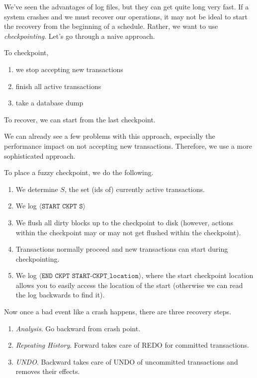     We've seen the advantages of log files, but they can get quite long very fast. If a system crashes and we must recover our operations, it may not be ideal to start the recovery from the beginning of a schedule. Rather, we want to use \textit{checkpointing}. Let's go through a naive approach. 

    \begin{definition}
      \label{def:naive-checkpointing}
       To checkpoint, 
       \begin{enumerate}
         \item we stop accepting new transactions 
         \item finish all active transactions 
         \item take a database dump
       \end{enumerate}
       To recover, we can start from the last checkpoint. 
    \end{definition} 

    We can already see a few problems with this approach, especially the performance impact on not accepting new transactions. Therefore, we use a more sophisticated approach. 

    \begin{definition}
      \label{def:fuzzy-checkpointing}
      To place a fuzzy checkpoint, we do the following. 
      \begin{enumerate}
        \item We determine $S$, the set (ids of) currently active transactions. 
        \item We log $\langle \texttt{START CKPT S} \rangle$ 
        \item We flush all dirty blocks up to the checkpoint to disk (however, actions within the checkpoint may or may not get flushed within the checkpoint). 
        \item Transactions normally proceed and new transactions can start during checkpointing. 
        \item We log $\langle \texttt{END CKPT START-CKPT\_location} \rangle$, where the start checkpoint location allows you to easily access the location of the start (otherwise we can read the log backwards to find it). 
      \end{enumerate}
      Now once a bad event like a crash happens, there are three recovery steps. 
      \begin{enumerate}
        \item \textit{Analysis}. Go backward from crash point. 
        \item \textit{Repeating History}. Forward takes care of REDO for committed transactions. 
        \item \textit{UNDO}. Backward takes care of UNDO of uncommitted transactions and removes their effects. 
      \end{enumerate}
    \end{definition} 

